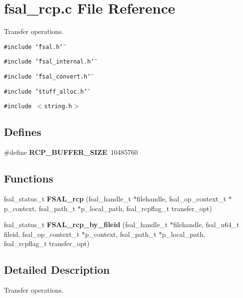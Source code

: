 \section{fsal\_\-rcp.c File Reference}
\label{fsal__rcp_8c}
Transfer operations. 

{\tt \#include \char`\"{}fsal.h\char`\"{}}\par
{\tt \#include \char`\"{}fsal\_\-internal.h\char`\"{}}\par
{\tt \#include \char`\"{}fsal\_\-convert.h\char`\"{}}\par
{\tt \#include \char`\"{}stuff\_\-alloc.h\char`\"{}}\par
{\tt \#include $<$string.h$>$}\par
\subsection*{Defines}
\begin{CompactItemize}
\item 
\#define {\bf RCP\_\-BUFFER\_\-SIZE}\ 10485760\label{fsal__rcp_8c_a0}

\end{CompactItemize}
\subsection*{Functions}
\begin{CompactItemize}
\item 
fsal\_\-status\_\-t {\bf FSAL\_\-rcp} (fsal\_\-handle\_\-t $\ast$filehandle, fsal\_\-op\_\-context\_\-t $\ast$p\_\-context, fsal\_\-path\_\-t $\ast$p\_\-local\_\-path, fsal\_\-rcpflag\_\-t transfer\_\-opt)
\item 
fsal\_\-status\_\-t {\bf FSAL\_\-rcp\_\-by\_\-fileid} (fsal\_\-handle\_\-t $\ast$filehandle, fsal\_\-u64\_\-t fileid, fsal\_\-op\_\-context\_\-t $\ast$p\_\-context, fsal\_\-path\_\-t $\ast$p\_\-local\_\-path, fsal\_\-rcpflag\_\-t transfer\_\-opt)\label{fsal__rcp_8c_a2}

\end{CompactItemize}


\subsection{Detailed Description}
Transfer operations. 

